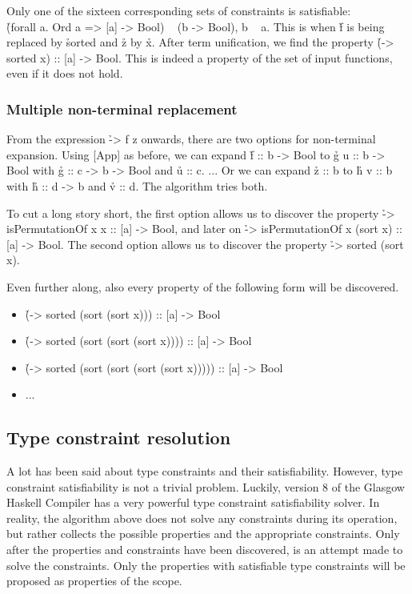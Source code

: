 \documentclass[a4paper, 11pt, onepage]{article}
\begin{document}
Only one of the sixteen corresponding sets of constraints is satisfiable:\\ \h{(forall a. Ord a => [a] -> Bool) ~ (b -> Bool), b ~ a}.
This is when \h{f} is being replaced by \h{sorted} and \h{z} by \h{x}.
After term unification, we find the property \h{(\x -> sorted x) :: [a] -> Bool}.
This is indeed a property of the set of input functions, even if it does not hold.

\subsubsection{Multiple non-terminal replacement}

From the expression \h{\x -> f z} onwards, there are two options for non-terminal expansion.
Using [App] as before, we can expand \h{f :: b -> Bool} to \h{g u :: b -> Bool} with \h{g :: c -> b -> Bool} and \h{u :: c}.
... Or we can expand \h{z :: b} to \h{h v :: b} with \h{h :: d -> b} and \h{v :: d}.
The algorithm tries both.

To cut a long story short, the first option allows us to discover the property \h{\x -> isPermutationOf x x :: [a] -> Bool}, and later on \h{\x -> isPermutationOf x (sort x) :: [a] -> Bool}.
The second option allows us to discover the property \h{\x -> sorted (sort x)}.

Even further along, also every property of the following form will be discovered.

\begin{itemize}
  \item \h{(\x -> sorted (sort (sort x))) :: [a] -> Bool}
  \item \h{(\x -> sorted (sort (sort (sort x)))) :: [a] -> Bool}
  \item \h{(\x -> sorted (sort (sort (sort (sort x))))) :: [a] -> Bool}
  \item ...
\end{itemize}


\subsection{Type constraint resolution}

A lot has been said about type constraints and their satisfiability.
However, type constraint satisfiability is not a trivial problem.
Luckily, version 8 of the Glasgow Haskell Compiler \cite{GHC8} has a very powerful type constraint satisfiability solver\cite{Schrijvers2015}.
In reality, the algorithm above does not solve any constraints during its operation, but rather collects the possible properties and the appropriate constraints.
Only after the properties and constraints have been discovered, is an attempt made to solve the constraints.
Only the properties with satisfiable type constraints will be proposed as properties of the scope.
\end{document}

